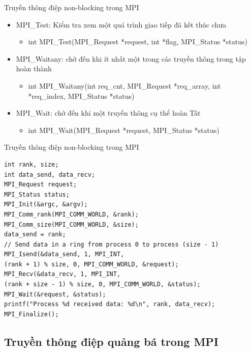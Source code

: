 \documentclass[10pt]{beamer}
\theoremstyle{remark}
\numberwithin{algocf}{section}
\numberwithin{equation}{section}
\numberwithin{dl}{section}
\numberwithin{figure}{section}
\begin{document}
\begin{frame}{Truyền thông điệp non-blocking trong MPI}
    \begin{itemize}
        \item MPI\_Test: Kiểm tra xem một quá trình giao tiếp đã kết thúc chưa
        \begin{itemize}
            \item int MPI\_Test(MPI\_Request *request, int *flag,
                                MPI\_Status *status) 
        \end{itemize}
        \item MPI\_Waitany: chờ đến khi ít nhất một trong các truyền thông trong tập hoàn thành
        \begin{itemize}
            \item int MPI\_Waitany(int req\_cnt, MPI\_Request *req\_array,
                                   int *req\_index, MPI\_Status *status) 
        \end{itemize}
        \item MPI\_Wait: chờ đến khi một truyền thông cụ thể hoàn Tất
        \begin{itemize}
            \item int MPI\_Wait(MPI\_Request *request, MPI\_Status *status)
        \end{itemize}
    \end{itemize}
\end{frame}

\begin{frame}[fragile]{Truyền thông điệp non-blocking trong MPI}
    \begin{verbatim}
int rank, size;
int data_send, data_recv;
MPI_Request request;
MPI_Status status;
MPI_Init(&argc, &argv);
MPI_Comm_rank(MPI_COMM_WORLD, &rank);
MPI_Comm_size(MPI_COMM_WORLD, &size);
data_send = rank;
// Send data in a ring from process 0 to process (size - 1)
MPI_Isend(&data_send, 1, MPI_INT, 
(rank + 1) % size, 0, MPI_COMM_WORLD, &request);
MPI_Recv(&data_recv, 1, MPI_INT, 
(rank + size - 1) % size, 0, MPI_COMM_WORLD, &status);
MPI_Wait(&request, &status); 
printf("Process %d received data: %d\n", rank, data_recv);
MPI_Finalize();
    \end{verbatim}
\end{frame}

\subsection{Truyền thông điệp quảng bá trong MPI}
\end{document}
